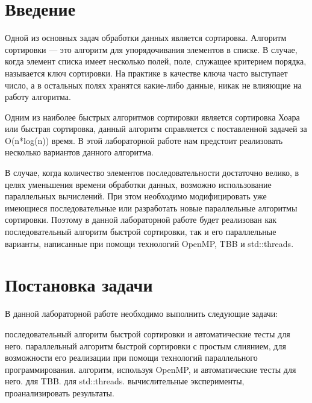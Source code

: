 \documentclass{report}
\begin{document}
\setcounter{page}{2}

\tableofcontents
\newpage

\section*{Введение}
Одной из основных задач обработки данных является сортировка. Алгоритм сортировки — это алгоритм для упорядочивания элементов в списке. В случае, когда элемент списка имеет несколько полей, поле, служащее критерием порядка, называется ключ сортировки. На практике в качестве ключа часто выступает число, а в остальных полях хранятся какие-либо данные, никак не влияющие на работу алгоритма.
\par Одним из наиболее быстрых алгоритмов сортировки является сортировка Хоара или быстрая сортировка, данный алгоритм справляется с поставленной задачей за O(n*log(n)) время. В этой лабораторной работе нам предстоит реализовать несколько вариантов данного алгоритма.
\par В случае, когда количество элементов последовательности достаточно велико, в целях уменьшения времени обработки данных, возможно использование параллельных вычислений. При этом необходимо модифицировать уже имеющиеся последовательные или разработать новые параллельные алгоритмы сортировки. Поэтому в данной лабораторной работе будет реализован как последовательный алгоритм быстрой сортировки, так и его параллельные варианты, написанные при помощи технологий OpenMP, TBB и std::threads. 
\newpage

\section*{Постановка задачи}

В данной лабораторной работе необходимо выполнить следующие задачи:

\begin{enumerate} 

 последовательный алгоритм быстрой сортировки и автоматические тесты для него.
 параллельный алгоритм быстрой сортировки с простым слиянием, для возможности его реализации при помощи технологий параллельного программирования.
 алгоритм, используя OpenMP, и автоматические тесты для него.
 для TBB.
 для std::threads.
 вычислительные эксперименты, проанализировать результаты.

\end{enumerate} 
\end{document}
